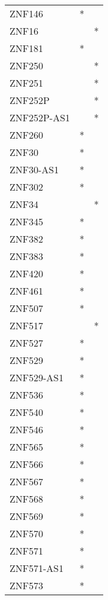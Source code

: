 \begin{longtable}{lcc}
ZNF146       &         * &         \\
ZNF16        &           &       * \\
ZNF181       &         * &         \\
ZNF250       &           &       * \\
ZNF251       &           &       * \\
ZNF252P      &           &       * \\
ZNF252P-AS1  &           &       * \\
ZNF260       &         * &         \\
ZNF30        &         * &         \\
ZNF30-AS1    &         * &         \\
ZNF302       &         * &         \\
ZNF34        &           &       * \\
ZNF345       &         * &         \\
ZNF382       &         * &         \\
ZNF383       &         * &         \\
ZNF420       &         * &         \\
ZNF461       &         * &         \\
ZNF507       &         * &         \\
ZNF517       &           &       * \\
ZNF527       &         * &         \\
ZNF529       &         * &         \\
ZNF529-AS1   &         * &         \\
ZNF536       &         * &         \\
ZNF540       &         * &         \\
ZNF546       &         * &         \\
ZNF565       &         * &         \\
ZNF566       &         * &         \\
ZNF567       &         * &         \\
ZNF568       &         * &         \\
ZNF569       &         * &         \\
ZNF570       &         * &         \\
ZNF571       &         * &         \\
ZNF571-AS1   &         * &         \\
ZNF573       &         * &         \\

\end{longtable}
